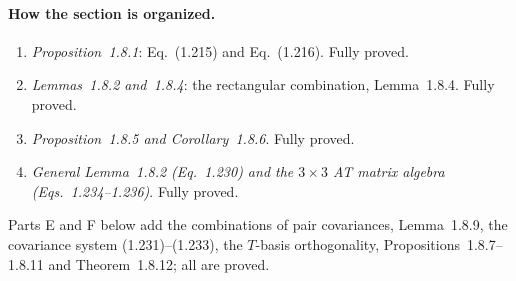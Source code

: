 \paragraph{How the section is organized.}
\begin{enumerate}
\item[A.] \emph{Proposition~1.8.1}: Eq.~(1.215) and Eq.~(1.216).  Fully proved.
\item[B.] \emph{Lemmas~1.8.2 and~1.8.4}: the rectangular combination, Lemma~1.8.4.  Fully proved.
\item[C.] \emph{Proposition~1.8.5 and Corollary~1.8.6}.  Fully proved.
\item[D.] \emph{General Lemma~1.8.2 (Eq.~1.230) and the $3\times3$ AT matrix algebra (Eqs.~1.234--1.236)}.  Fully proved.
\end{enumerate}
Parts E and F below add the combinations of pair covariances, Lemma~1.8.9, the covariance system (1.231)--(1.233), the $T$-basis orthogonality, Propositions~1.8.7--1.8.11 and Theorem~1.8.12; all are proved.

